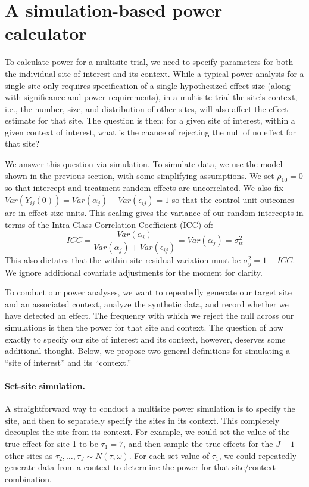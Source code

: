 \documentclass[]{article}
\begin{document}
\section{A simulation-based power calculator}

To calculate power for a multisite trial, we need to specify parameters for both the individual site of interest and its context.
While a typical power analysis for a single site only requires specification of a single hypothesized effect size (along with significance and power requirements), in a multisite trial the site's context, i.e., the number, size, and distribution of other sites, will also affect the effect estimate for that site.
The question is then: for a given site of interest, within a given context of interest, what is the chance of rejecting the null of no effect for that site?

We answer this question via simulation.
To simulate data, we use the model shown in the previous section, with some simplifying assumptions.
We set $\rho_{10} = 0$ so that intercept and treatment random effects are uncorrelated.
We also fix $Var(Y_{ij}(0)) = Var(\alpha_j) + Var(\epsilon_{ij}) = 1$ so that the control-unit outcomes are in effect size units.
This scaling gives the variance of our random intercepts in terms of the Intra Class Correlation Coefficient (ICC) of:
$$ICC = \frac{Var(\alpha_i)}{Var(\alpha_j) + Var(\epsilon_{ij})} = Var(\alpha_j) = \sigma^2_\alpha$$
This also dictates that the within-site residual variation must be $\sigma^2_y = 1-ICC$.
We ignore additional covariate adjustments for the moment for clarity.

To conduct our power analyses, we want to repeatedly generate our target site and an associated context, analyze the synthetic data, and record whether we have detected an effect.
The frequency with which we reject the null across our simulations is then the power for that site and context.
The question of how exactly to specify our site of interest and its context, however, deserves some additional thought.
Below, we propose two general definitions for simulating a ``site of interest'' and its ``context.''

\paragraph{Set-site simulation.} A straightforward way to conduct a multisite power simulation is to specify the site, and then to separately specify the sites in its context.
This completely decouples the site from its context.
For example, we could set the value of the true effect for site 1 to be $\tau_1 = 7$, and then sample the true effects for the $J-1$ other sites as $\tau_2, \dots, \tau_J \sim N(\tau, \omega)$.
For each set value of $\tau_1$, we could repeatedly generate data from a context to determine the power for that site/context combination.
\end{document}
